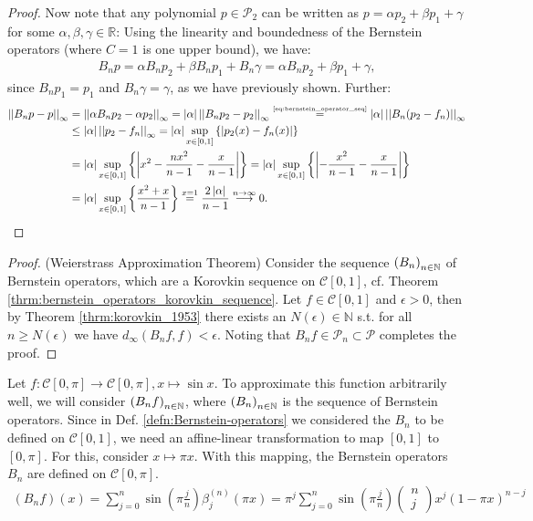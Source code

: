 \begin{proof}
	Now note that any polynomial $p\in\mathcal P_2$ can be written as $p = \alpha p_2 + \beta p_1 + \gamma$ for some $\alpha, \beta, \gamma\in\mathbb R$: Using the linearity and boundedness of the Bernstein operators (where $C=1$ is one upper bound), we have:
	\begin{align}
		B_n p = \alpha B_n p_2 + \beta B_np_1 + B_n\gamma = \alpha B_n p_2 + \beta p_1 + \gamma,
	\end{align}
	since $B_n p_1 = p_1$ and $B_n\gamma = \gamma$, as we have previously shown. Further:
	\begin{align}
		\begin{split}
			\norm{B_n p - p}{\infty} &= \norm{\alpha B_np_2 - \alpha p_2}{\infty} = \abs{\alpha}\norm{B_n p_2 - p_2}{\infty} \overset{\tiny\eqref{eq:bernstein_operator_seq}}{=} \abs{\alpha}\norm{B_n(p_2 - f_n)}{\infty}
			\\ &\leq \abs{\alpha}\norm{p_2 - f_n}{\infty} = \abs{\alpha}\sup_{x\in[0, 1]}\left\{\abs{p_2(x) - f_n(x)}\right\} 
			\\ &= \abs{\alpha}\sup_{x\in[0, 1]}\left\{\abs{x^2 - \frac{nx^2}{n-1}- \frac{x}{n-1}}\right\} = \abs{\alpha}\sup_{x\in[0, 1]}\left\{\abs{- \frac{x^2}{n-1}- \frac{x}{n-1}}\right\}
			\\ &= \abs{\alpha}\sup_{x\in[0, 1]}\left\{ \frac{x^2 + x}{n-1} \right\} \overset{x=1}{=}\frac{2\abs{\alpha}}{n-1} \overset{n\to\infty}{\longrightarrow} 0.
		\end{split}
	\end{align}	 
\end{proof}

\begin{proof}(Weierstrass Approximation Theorem)
	Consider the sequence $\seq[B_n]$ of Bernstein operators, which are a Korovkin sequence on $\mathcal C[0, 1]$, cf. Theorem \ref{thrm:bernstein_operators_korovkin_sequence}. Let $f\in\mathcal C[0, 1]$ and $\epsilon > 0$, then by Theorem \ref{thrm:korovkin_1953} there exists an $N(\epsilon)\in\mathbb N$ s.t. for all $n\geq N(\epsilon)$ we have $d_{\infty}(B_nf, f) < \epsilon$. Noting that $B_nf\in\mathcal P_n\subset \mathcal P$ completes the proof.
\end{proof}
	
\begin{exmp}
	Let $f:\mathcal C[0, \pi]\to\mathcal C[0, \pi], x\mapsto \sin x$. To approximate this function arbitrarily well, we will consider $\seq[B_nf]$, where $\seq[B_n]$ is the sequence of Bernstein operators. Since in Def. \ref{defn:Bernstein-operators} we considered the $B_n$ to be defined on $\mathcal C[0, 1]$, we need an affine-linear transformation to map $[0, 1]$ to $[0, \pi]$. For this, consider $x\mapsto \pi x$. With this mapping, the Bernstein operators $B_n$ are defined on $\mathcal C[0, \pi]$.
	\begin{align}
		(B_nf)(x) = \sum_{j=0}^{n}\sin\left(\pi\frac{j}{n}\right)\beta_{j}^{(n)}(\pi x) = \pi^j\sum_{j=0}^{n}\sin\left(\pi\frac{j}{n}\right)\begin{pmatrix}n\\ j\end{pmatrix} x^j(1-\pi x)^{n-j}
	\end{align}
\end{exmp}

